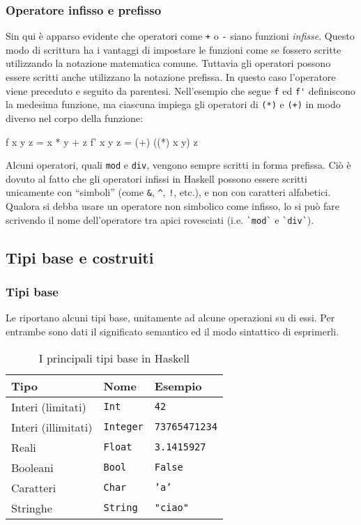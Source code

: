 \subsubsection{Operatore infisso e 
prefisso}
Sin qui \`e apparso evidente che operatori come \verb"+" o \verb"-" siano 
funzioni \emph{infisse}. Questo modo di 
scrittura ha i vantaggi di impostare le funzioni come se fossero scritte
utilizzando la notazione matematica comune. Tuttavia gli operatori possono essere scritti anche utilizzano la notazione prefissa.
 In questo caso 
l'operatore viene preceduto e seguito da parentesi. Nell'esempio che 
segue \verb"f" ed \verb"f'" definiscono la medesima funzione, ma ciascuna 
impiega gli operatori di \verb"(*)" e \verb"(+)" in modo diverso nel corpo 
della funzione:
\begin{haskellCode}
f  x y z  = x * y + z
f' x y z  = (+) ((*) x y) z
\end{haskellCode}
Alcuni operatori, quali \verb"mod" e \verb"div", vengono sempre scritti in 
forma prefissa. Ci\`o \`e dovuto al fatto che gli operatori infissi in 
Haskell possono essere scritti unicamente con ``simboli'' (come \verb"&", 
\verb"^", \verb"!", etc.), e non con caratteri alfabetici. Qualora si 
debba usare un operatore non simbolico come infisso, lo si pu\`o fare 
scrivendo il nome dell'operatore tra apici rovesciati (i.e. \verb"`mod`" e \verb"`div`").

\subsection{Tipi base e costruiti}

\subsubsection{Tipi base}
Le  riportano 
alcuni tipi base, unitamente ad alcune operazioni su di essi. Per 
entrambe sono dati il significato semantico ed il modo sintattico di 
esprimerli.
\begin{table}[htb]
    \begin{center}
        \begin{tabular}{|l | l | l|}
            \hline
            Tipo & Nome & Esempio \\
            \hline
            Interi (limitati) & \texttt{Int} & \texttt{42} \\
            Interi (illimitati) & \texttt{Integer} & \texttt{73765471234} \\
            Reali & \texttt{Float} & \texttt{3.1415927} \\
            Booleani & \texttt{Bool} & \texttt{False} \\
            Caratteri & \texttt{Char} & \texttt{'a'} \\
            Stringhe & \texttt{String} & \verb|"ciao"| \\
            \hline
        \end{tabular}
        \caption{I principali tipi base in Haskell}
        \label{tab:funprog-tipibase}
    \end{center}
\end{table}


